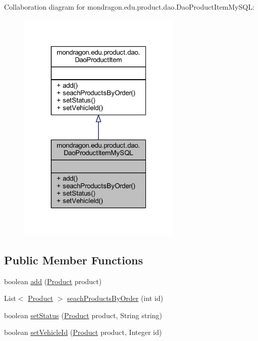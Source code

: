 Collaboration diagram for mondragon.\+edu.\+product.\+dao.\+Dao\+Product\+Item\+My\+S\+QL\+:\nopagebreak
\begin{figure}[H]
\begin{center}
\leavevmode
\includegraphics[width=220pt]{classmondragon_1_1edu_1_1product_1_1dao_1_1_dao_product_item_my_s_q_l__coll__graph}
\end{center}
\end{figure}
\subsection*{Public Member Functions}
\begin{DoxyCompactItemize}
\item 
boolean \mbox{\hyperlink{classmondragon_1_1edu_1_1product_1_1dao_1_1_dao_product_item_my_s_q_l_a8ae93fe6663f9100eeac4ee99e043fdf}{add}} (\mbox{\hyperlink{classmondragon_1_1edu_1_1clases_1_1_product}{Product}} product)
\item 
List$<$ \mbox{\hyperlink{classmondragon_1_1edu_1_1clases_1_1_product}{Product}} $>$ \mbox{\hyperlink{classmondragon_1_1edu_1_1product_1_1dao_1_1_dao_product_item_my_s_q_l_a7a4b68a51778004dfcb03a5c0969c6bd}{seach\+Products\+By\+Order}} (int id)
\item 
boolean \mbox{\hyperlink{classmondragon_1_1edu_1_1product_1_1dao_1_1_dao_product_item_my_s_q_l_a213e0f08b6cc25eff27930673c532214}{set\+Status}} (\mbox{\hyperlink{classmondragon_1_1edu_1_1clases_1_1_product}{Product}} product, String string)
\item 
boolean \mbox{\hyperlink{classmondragon_1_1edu_1_1product_1_1dao_1_1_dao_product_item_my_s_q_l_a30861c4e6430b735f2516ae579c72af3}{set\+Vehicle\+Id}} (\mbox{\hyperlink{classmondragon_1_1edu_1_1clases_1_1_product}{Product}} product, Integer id)
\end{DoxyCompactItemize}


